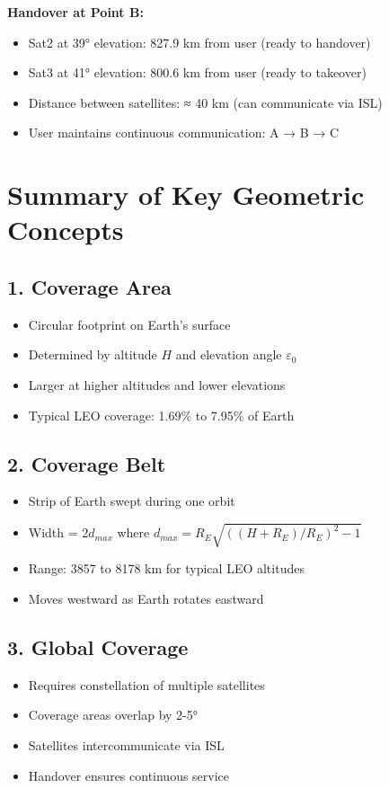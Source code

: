 \documentclass[11pt,letterpaper]{article}
\begin{document}
\textbf{Handover at Point B:}
\begin{itemize}
    \item Sat2 at 39° elevation: 827.9 km from user (ready to handover)
    \item Sat3 at 41° elevation: 800.6 km from user (ready to takeover)
    \item Distance between satellites: ≈ 40 km (can communicate via ISL)
    \item User maintains continuous communication: A → B → C
\end{itemize}

\newpage

\section*{Summary of Key Geometric Concepts}

\subsection*{1. Coverage Area}
\begin{itemize}
    \item Circular footprint on Earth's surface
    \item Determined by altitude $H$ and elevation angle $\varepsilon_0$
    \item Larger at higher altitudes and lower elevations
    \item Typical LEO coverage: 1.69\% to 7.95\% of Earth
\end{itemize}

\subsection*{2. Coverage Belt}
\begin{itemize}
    \item Strip of Earth swept during one orbit
    \item Width = $2d_{max}$ where $d_{max} = R_E\sqrt{((H+R_E)/R_E)^2 - 1}$
    \item Range: 3857 to 8178 km for typical LEO altitudes
    \item Moves westward as Earth rotates eastward
\end{itemize}

\subsection*{3. Global Coverage}
\begin{itemize}
    \item Requires constellation of multiple satellites
    \item Coverage areas overlap by 2-5°
    \item Satellites intercommunicate via ISL
    \item Handover ensures continuous service
\end{itemize}
\end{document}
